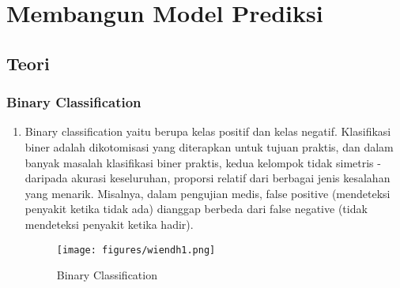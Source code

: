 \chapter{Membangun Model Prediksi}
\section{Teori}
\subsection{Binary Classification}
\begin{enumerate}
\item Binary classification yaitu berupa kelas positif dan kelas negatif. Klasifikasi biner adalah dikotomisasi yang diterapkan untuk tujuan praktis, dan dalam banyak masalah klasifikasi biner praktis, kedua kelompok tidak simetris - daripada akurasi keseluruhan, proporsi relatif dari berbagai jenis kesalahan yang menarik. Misalnya, dalam pengujian medis, false positive (mendeteksi penyakit ketika tidak ada) dianggap berbeda dari false negative (tidak mendeteksi penyakit ketika hadir).
\begin{figure}[ht]
\centering
\texttt{[image: figures/wiendh1.png]}
\caption{Binary Classification}
\label{contoh}
\end{figure}
\end{enumerate}

